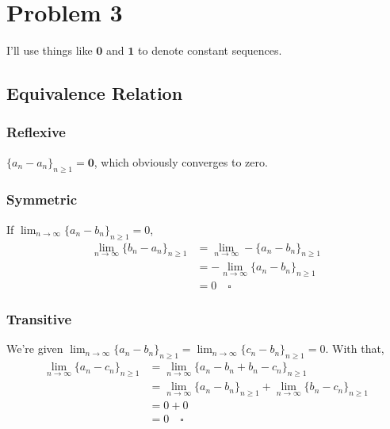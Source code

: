 \documentclass[12pt]{article}
\begin{document}
\section{Problem 3}


I'll use things like $\mathbf{0}$ and $\mathbf{1}$ to denote constant sequences.

\subsection{Equivalence Relation}

\subsubsection{Reflexive}

$\{a_n-a_n\}_{n \ge 1}=\mathbf{0}$, which obviously converges to zero.

\subsubsection{Symmetric}

If $\lim_{n \to \infty} \{a_n-b_n\}_{n \ge 1} = 0$,
\begin{align*}
  \lim_{n \to \infty} \{b_n-a_n\}_{n \ge 1}
   & = \lim_{n \to \infty} -\{a_n-b_n\}_{n \ge 1} \\
   & = -\lim_{n \to \infty} \{a_n-b_n\}_{n \ge 1} \\
   & = 0 \quad\square
\end{align*}

\subsubsection{Transitive}

We're given $\lim_{n \to \infty} \{a_n-b_n\}_{n \ge 1}=\lim_{n \to \infty} \{c_n-b_n\}_{n \ge 1}=0$.
With that,
\begin{align*}
  \lim_{n \to \infty} \{a_n-c_n\}_{n \ge 1}
   & = \lim_{n \to \infty} \{a_n-b_n+b_n-c_n\}_{n \ge 1}                                     \\
   & = \lim_{n \to \infty} \{a_n-b_n\}_{n \ge 1} + \lim_{n \to \infty} \{b_n-c_n\}_{n \ge 1} \\
   & = 0 + 0                                                                                 \\
   & = 0 \quad\square
\end{align*}
\end{document}
